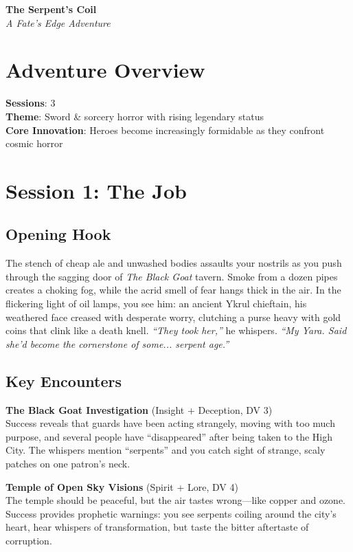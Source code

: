 \documentclass[11pt]{article}
\begin{document}
\begin{center}
    {\Huge \textbf{The Serpent's Coil}}\\[0.5em]
    {\Large \textit{A Fate's Edge Adventure}}
\end{center}

\section*{Adventure Overview}
\textbf{Sessions}: 3\\
\textbf{Theme}: Sword \& sorcery horror with rising legendary status\\
\textbf{Core Innovation}: Heroes become increasingly formidable as they confront cosmic horror

\section{Session 1: The Job}

\subsection*{Opening Hook}
The stench of cheap ale and unwashed bodies assaults your nostrils as you push through the sagging door of \textit{The Black Goat} tavern. Smoke from a dozen pipes creates a choking fog, while the acrid smell of fear hangs thick in the air. In the flickering light of oil lamps, you see him: an ancient Ykrul chieftain, his weathered face creased with desperate worry, clutching a purse heavy with gold coins that clink like a death knell. \textit{“They took her,”} he whispers. \textit{“My Yara. Said she'd become the cornerstone of some... serpent age.”}

\subsection*{Key Encounters}

\textbf{The Black Goat Investigation} (Insight + Deception, DV 3)\\
Success reveals that guards have been acting strangely, moving with too much purpose, and several people have “disappeared” after being taken to the High City. The whispers mention “serpents” and you catch sight of strange, scaly patches on one patron’s neck.

\textbf{Temple of Open Sky Visions} (Spirit + Lore, DV 4)\\
The temple should be peaceful, but the air tastes wrong—like copper and ozone. Success provides prophetic warnings: you see serpents coiling around the city’s heart, hear whispers of transformation, but taste the bitter aftertaste of corruption.
\end{document}
